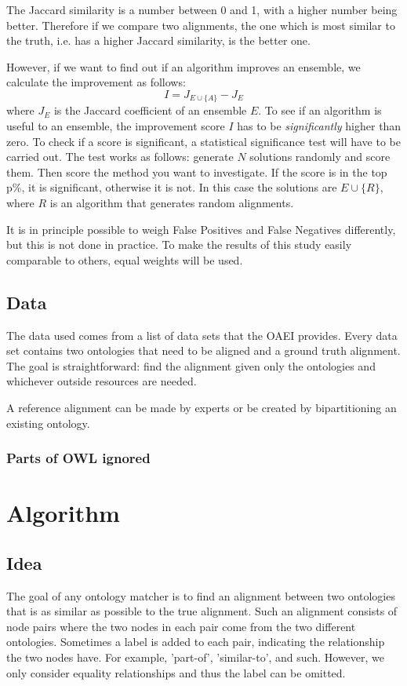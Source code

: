 \documentclass{article}
\begin{document}
 The Jaccard similarity is a number between 0 and 1, with a higher number being better. Therefore if we compare two alignments, the one which is most similar to the truth, i.e. has a higher Jaccard similarity, is the better one.
 
 However, if we want to find out if an algorithm improves an ensemble, we calculate the improvement as follows:
 \[
 I = J_{E\cup \{A\}} - J_E
 \]
 where $J_E$ is the Jaccard coefficient of an ensemble $E$.
 To see if an algorithm is useful to an ensemble, the improvement score $I$ has to be \emph{significantly} higher than zero. To check if a score is significant, a statistical significance test will have to be carried out. The test works as follows: generate $N$ solutions randomly and score them. Then score the method you want to investigate. If the score is in the top p\%, it is significant, otherwise it is not. In this case the solutions are $E\cup \{R\}$, where $R$ is an algorithm that generates random alignments.
 
 It is in principle possible to weigh False Positives and False Negatives differently, but this is not done in practice. To make the results of this study easily comparable to others, equal weights will be used.
 \subsection{Data}
 The data used comes from a list of data sets that the OAEI provides. %
 Every data set contains two ontologies that need to be aligned and a ground truth alignment. The goal is straightforward: find the alignment given only the ontologies and whichever outside resources are needed.

 A reference alignment can be made by experts or be created by bipartitioning an existing ontology. %
 \subsubsection{Parts of OWL ignored} 
 
 \section{Algorithm}
 \subsection{Idea}
 The goal of any ontology matcher is to find an alignment between two ontologies that is as similar as possible to the true alignment. Such an alignment consists of node pairs where the two nodes in each pair come from the two different ontologies. Sometimes a label is added to each pair, indicating the relationship the two nodes have. For example, 'part-of', 'similar-to', and such. However, we only consider equality relationships and thus the label can be omitted.
 
\end{document}
